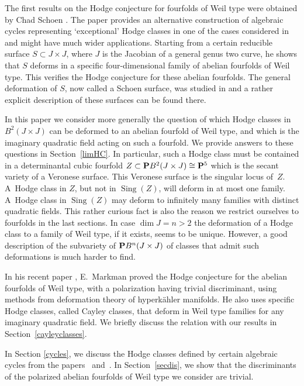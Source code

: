 \documentclass[pdftex]{sigma}
\numberwithin{equation}{section}
\begin{document}
The first results on the Hodge conjecture for fourfolds of Weil type were obtained
by Chad Schoen \cite{schoenhodge, Sadd}.
The paper \cite{schoen} provides an alternative
construction of algebraic cycles representing `exceptional' Hodge classes in
one of the cases considered in~\cite{schoenhodge}
and might have much wider applications.
Starting from a certain reducible surface $S\subset J\times J$,
where $J$ is the Jacobian of a general genus two curve, he shows that $S$ deforms
in a specific four-dimensional family of abelian fourfolds of Weil type.
This verifies the Hodge conjecture for these abelian fourfolds.
The general deformation of $S$, now called a Schoen surface,
was studied in \cite{CMLR, RRS} and a rather explicit description
of these surfaces can be found there.

In this paper we consider more generally the question
of which Hodge classes in $B^2(J\times J)$
can be deformed to an abelian fourfold of Weil type,
and which is the imaginary quadratic field acting on such a fourfold.
We provide answers to these questions in Section~\ref{limHC}.
In particular, such a Hodge class must be contained
in a determinantal cubic fourfold $Z\subset {\bf P} B^2(J\times J)\cong {\bf P}^5$
which is the secant variety of a Veronese surface.
This Veronese surface is the singular locus of~$Z$. A~Hodge class in $Z$, but not in $\operatorname{Sing}(Z)$,
will deform in at most one family. A~Hodge class in $\operatorname{Sing}(Z)$ may
deform to infinitely many families with distinct quadratic fields.
This rather curious fact is also the reason we restrict ourselves to fourfolds in the last sections.
In case $\dim J=n>2$ the deformation of a Hodge class to a family of Weil type, if it exists,
seems to be unique. However, a good description of the subvariety of ${\bf P} B^n(J\times J)$ of classes
that admit such deformations is much harder to find.

In his recent paper \cite{Markman}, E.~Markman
proved the Hodge conjecture for the
abelian fourfolds of Weil type,
with a polarization having trivial discriminant, using methods
from deformation theory of hyperk\"ahler manifolds. He also uses specific Hodge classes,
called Cayley classes, that deform in Weil type families for any imaginary quadratic field.
We briefly discuss the relation with our results in Section~\ref{cayleyclasses}.

In Section \ref{cycles}, we discuss the Hodge classes defined by certain algebraic
cycles from the papers~\cite{schoen} and~\cite{vG}.
In Section~\ref{secdis}, we show that the discriminants of the polarized abelian fourfolds
of Weil type we consider are trivial.
\end{document}

